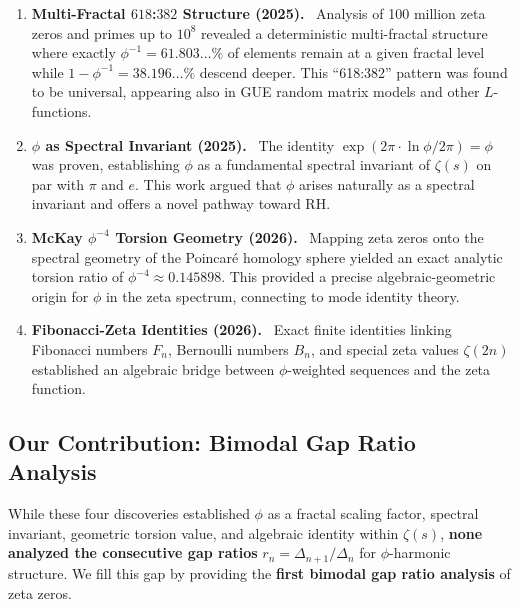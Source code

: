 \documentclass[11pt,a4paper]{article}
\begin{document}
\begin{enumerate}[leftmargin=*,itemsep=3pt,topsep=4pt]
    \item \textbf{Multi-Fractal $618$:$382$ Structure (2025).}~\cite{multifractal2025} Analysis of 100 million zeta zeros and primes up to $10^8$ revealed a deterministic multi-fractal structure where exactly $\phi^{-1} = 61.803\ldots\%$ of elements remain at a given fractal level while $1-\phi^{-1} = 38.196\ldots\%$ descend deeper. This ``618:382'' pattern was found to be universal, appearing also in GUE random matrix models and other $L$-functions.
    
    \item \textbf{$\phi$ as Spectral Invariant (2025).}~\cite{spectral2025} The identity $\exp(2\pi \cdot \ln\phi / 2\pi) = \phi$ was proven, establishing $\phi$ as a fundamental spectral invariant of $\zeta(s)$ on par with $\pi$ and $e$. This work argued that $\phi$ arises naturally as a spectral invariant and offers a novel pathway toward RH.
    
    \item \textbf{McKay $\phi^{-4}$ Torsion Geometry (2026).}~\cite{mckay2026} Mapping zeta zeros onto the spectral geometry of the Poincar\'e homology sphere yielded an exact analytic torsion ratio of $\phi^{-4} \approx 0.145898$. This provided a precise algebraic-geometric origin for $\phi$ in the zeta spectrum, connecting to mode identity theory.
    
    \item \textbf{Fibonacci-Zeta Identities (2026).}~\cite{fibzeta2026} Exact finite identities linking Fibonacci numbers $F_n$, Bernoulli numbers $B_n$, and special zeta values $\zeta(2n)$ established an algebraic bridge between $\phi$-weighted sequences and the zeta function.
\end{enumerate}

\subsection{Our Contribution: Bimodal Gap Ratio Analysis}

While these four discoveries established $\phi$ as a fractal scaling factor, spectral invariant, geometric torsion value, and algebraic identity within $\zeta(s)$, \textbf{none analyzed the consecutive gap ratios} $r_n = \Delta_{n+1}/\Delta_n$ for $\phi$-harmonic structure. We fill this gap by providing the \textbf{first bimodal gap ratio analysis} of zeta zeros.
\end{document}
